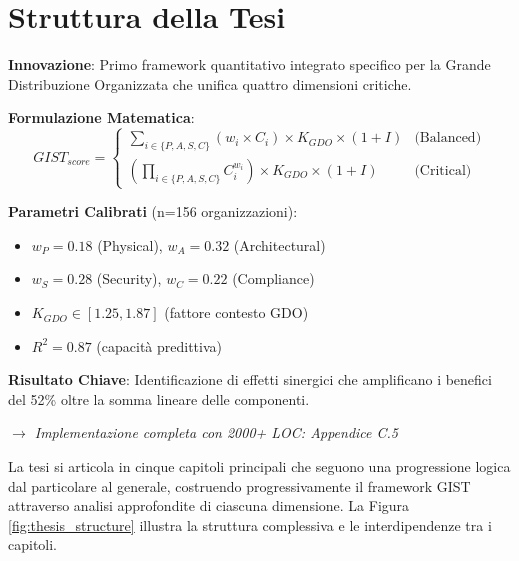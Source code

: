 \section{Struttura della Tesi}
\begin{tcolorbox}[
    colback=blue!5!white,
    colframe=blue!75!black,
    title={\textbf{Innovation Box 1.1:} Framework GIST - Contributo Metodologico Principale},
    fonttitle=\bfseries,
    boxrule=1.5pt,
    arc=2mm,
    breakable
]
\textbf{Innovazione}: Primo framework quantitativo integrato specifico per la Grande Distribuzione Organizzata che unifica quattro dimensioni critiche.

\vspace{0.3cm}
\textbf{Formulazione Matematica}:
\begin{equation*}
GIST_{score} = \begin{cases}
\sum_{i \in \{P,A,S,C\}} (w_i \times C_i) \times K_{GDO} \times (1+I) & \text{(Balanced)} \\
\left(\prod_{i \in \{P,A,S,C\}} C_i^{w_i}\right) \times K_{GDO} \times (1+I) & \text{(Critical)}
\end{cases}
\end{equation*}

\vspace{0.3cm}
\textbf{Parametri Calibrati} (n=156 organizzazioni):
\begin{itemize}%
    \item $w_P = 0.18$ (Physical), $w_A = 0.32$ (Architectural)
    \item $w_S = 0.28$ (Security), $w_C = 0.22$ (Compliance)
    \item $K_{GDO} \in [1.25, 1.87]$ (fattore contesto GDO)
    \item $R^2 = 0.87$ (capacità predittiva)
\end{itemize}

\vspace{0.3cm}
\textbf{Risultato Chiave}: Identificazione di effetti sinergici che amplificano i benefici del 52\% oltre la somma lineare delle componenti.

\vspace{0.2cm}
\textit{$\rightarrow$ Implementazione completa con 2000+ LOC: Appendice C.5}
\end{tcolorbox}

La tesi si articola in cinque capitoli principali che seguono una progressione logica dal particolare al generale, costruendo progressivamente il framework GIST attraverso analisi approfondite di ciascuna dimensione. La Figura \ref{fig:thesis_structure} illustra la struttura complessiva e le interdipendenze tra i capitoli.

